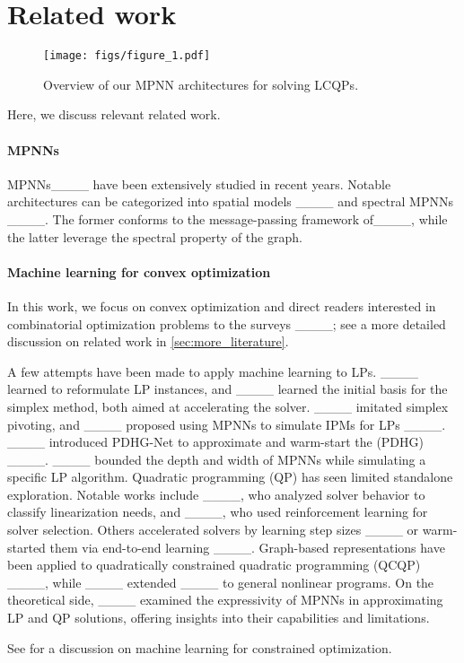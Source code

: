 \section{Related work}
\begin{figure*}
\begin{center}
\texttt{[image: figs/figure\_1.pdf]}
\end{center}
\vspace{-20pt}
\caption{Overview of our MPNN architectures for solving LCQPs.}
\end{figure*}

Here, we discuss relevant related work.

\paragraph{MPNNs} MPNNs____ have been extensively studied in recent years. Notable architectures can be categorized into spatial models ____ and spectral MPNNs ____. The former conforms to the message-passing framework of____, while the latter leverage the spectral property of the graph. 

\paragraph{Machine learning for convex optimization}
In this work, we focus on convex optimization and direct readers interested in combinatorial optimization problems to the surveys ____; see a more detailed discussion on related work in \cref{sec:more_literature}.

A few attempts have been made to apply machine learning to LPs. ____ learned to reformulate LP instances, and ____ learned the initial basis for the simplex method, both aimed at accelerating the solver. ____ imitated simplex pivoting, and ____ proposed using MPNNs to simulate IPMs for LPs ____. ____ introduced PDHG-Net to approximate and warm-start the  (PDHG)  ____. ____ bounded the depth and width of MPNNs while simulating a specific LP algorithm.
Quadratic programming (QP) has seen limited standalone exploration. Notable works include ____, who analyzed solver behavior to classify linearization needs, and ____, who used reinforcement learning for solver selection. Others accelerated solvers by learning step sizes ____ or warm-started them via end-to-end learning ____. Graph-based representations have been applied to quadratically constrained quadratic programming (QCQP) ____, while ____ extended ____ to general nonlinear programs.
On the theoretical side, ____ examined the expressivity of MPNNs in approximating LP and QP solutions, offering insights into their capabilities and limitations.

See  for a discussion on machine learning for constrained optimization.